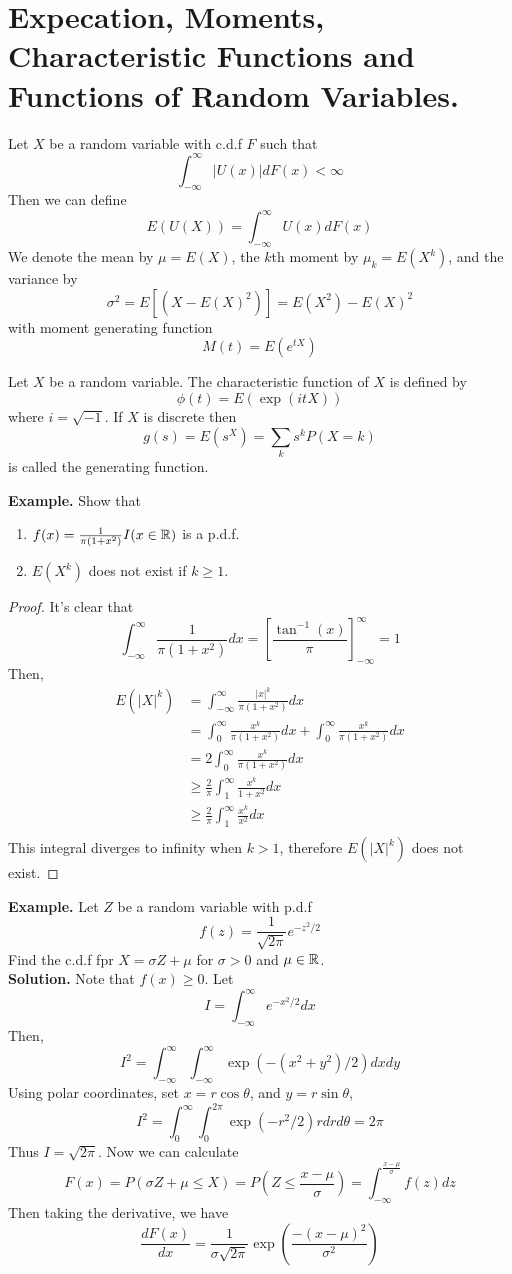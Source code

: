 \documentclass[openany]{report}
\begin{document}
\chapter{Expecation, Moments, Characteristic Functions and Functions of Random Variables.}

Let $X$ be a random variable with c.d.f $F$ such that 
\[\int_{-\infty}^\infty |U(x)|dF(x) < \infty\]
Then we can define 
\[E(U(X)) = \int_{-\infty}^\infty U(x)dF(x)\]
We denote the mean by $\mu = E(X)$, the $k$th moment by $\mu_k = E(X^k)$, and the variance by 
\[\sigma^2 = E[(X - E(X)^2)] = E(X^2) - E(X)^2\]  
with moment generating function
\[M(t) = E(e^{tX})\]

\begin{definition}
    Let $X$ be a random variable. The characteristic function of $X$ is defined by 
    \[\phi(t) = E(\exp(itX))\]
    where $i = \sqrt{-1}$. If $X$ is discrete then 
    \[g(s) = E(s^X) = \sum_k s^k P(X = k)\]
    is called the generating function.
\end{definition}
\noindent
\textbf{Example.} Show that 
\begin{enumerate}[label=(\roman*)]
    \item $f(x) = \frac{1}{\pi(1+x^2)}I(x \in \mathbb{R})$ is a p.d.f.
    \item $E(X^k)$ does not exist if $k \geq 1$. 
\end{enumerate}
\begin{proof}
    It's clear that 
    \[\int_{-\infty}^\infty \frac{1}{\pi(1 + x^2)}dx = \left[\frac{\tan^{-1}(x)}{\pi}\right]^\infty_{-\infty} = 1\]
    Then, 
    \begin{align*}
        E(|X|^k) &= \int_{-\infty}^\infty \frac{|x|^k}{\pi(1+x^2)}dx\\
        &= \int_{0}^\infty \frac{x^k}{\pi(1+x^2)}dx + \int_{0}^\infty \frac{x^k}{\pi(1+x^2)}dx\\
        &= 2\int_{0}^\infty \frac{x^k}{\pi(1+x^2)}dx\\
        &\geq \frac{2}{\pi}\int_{1}^\infty \frac{x^k}{1+x^2}dx\\
        &\geq \frac{2}{\pi}\int_{1}^\infty \frac{x^k}{x^2}dx\\
    \end{align*}
    This integral diverges to infinity when $k > 1$, therefore $E(|X|^k)$ does not exist. 
\end{proof}
\textbf{Example.} Let $Z$ be a random variable with p.d.f 
\[f(z) = \frac{1}{\sqrt{2\pi}}e^{-z^2/2}\]
Find the c.d.f fpr $X = \sigma Z + \mu$ for $\sigma > 0$ and $\mu \in \mathbb{R}$. \\[2ex]
\textbf{Solution.} Note that $f(x) \geq 0$. Let 
\[I = \int_{-\infty}^{\infty} e^{-x^2/2}dx\]
Then, 
\[I^2 = \int_{-\infty}^\infty\int_{-\infty}^\infty \exp(-(x^2+y^2)/2)dxdy\]
Using polar coordinates, set $x = r\cos \theta$, and $y = r \sin \theta$, 
\[I^2 = \int_{0}^\infty \int_0^{2\pi} \exp(-r^2/2)rdrd\theta = 2\pi\]
Thus $I = \sqrt{2\pi}$. Now we can calculate 
\[F(x) = P(\sigma Z + \mu \leq X) = P\left(Z \leq \frac{x - \mu}{\sigma}\right) = \int_{-\infty}^{\frac{x-\mu}{\sigma}}f(z)dz\]
Then taking the derivative, we have
\[\frac{dF(x)}{dx} = \frac{1}{\sigma\sqrt{2\pi}}\exp\left(\frac{-(x-\mu)^2}{\sigma^2}\right)\] 
\end{document}
